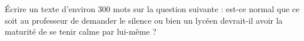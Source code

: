 
\begin{exercice}\label{exosmath-0429}

    Écrire un texte d'environ 300 mots sur la question suivante : est-ce normal que ce soit au professeur de demander le silence ou bien un lycéen devrait-il avoir la maturité de se tenir calme par lui-même ?

\end{exercice}
